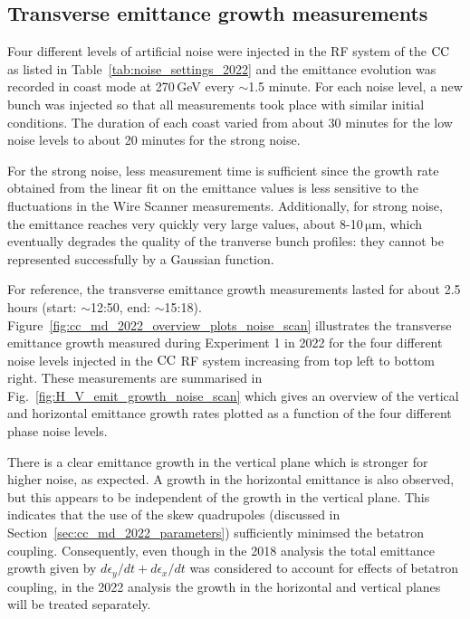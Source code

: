 \subsection{Transverse emittance growth measurements}\label{sec:cc_md_2022_exp1}
Four different levels of artificial noise were injected in the RF system of the ${\mathrm{CC}}$ as listed in Table~\ref{tab:noise_settings_2022} and the emittance evolution was recorded in coast mode at 270\,GeV every $\sim$1.5 minute. For each noise level, a new bunch was injected so that all measurements took place with similar initial conditions. The duration of each coast varied from about 30 minutes for the low noise levels to about 20 minutes for the strong noise. 

For the strong noise, less measurement time is sufficient since the growth rate obtained from the linear fit on the emittance values is less sensitive to the fluctuations in the Wire Scanner measurements. Additionally, for strong noise, the emittance reaches very quickly very large values, about 8-10\,$\mathrm{\mu m}$, which eventually degrades the quality of the tranverse bunch profiles: they cannot be represented successfully by a Gaussian function.  %

For reference, the transverse emittance growth measurements lasted for about 2.5\,hours (start: $\sim$12:50, end: $\sim$15:18). Figure~\ref{fig:cc_md_2022_overview_plots_noise_scan} illustrates the transverse emittance growth measured during Experiment 1 in 2022 for the four different noise levels injected in the ${\mathrm{CC}}$ RF system increasing from top left to bottom right. These measurements are summarised in Fig.~\ref{fig:H_V_emit_growth_noise_scan} which gives an overview of the vertical and horizontal emittance growth rates plotted as a function of the four different phase noise levels. 

There is a clear emittance growth in the vertical plane which is stronger for higher noise, as expected. A growth in the horizontal emittance is also observed, but this appears to be independent of the growth in the vertical plane. This indicates that the use of the skew quadrupoles (discussed in Section~\ref{sec:cc_md_2022_parameters}) sufficiently minimsed the betatron coupling. Consequently, even though in the 2018 analysis the total emittance growth given by $d\epsilon_y/dt +d\epsilon_x/dt $ was considered to account for effects of betatron coupling, in the 2022 analysis the growth in the horizontal and vertical planes will be treated separately.


